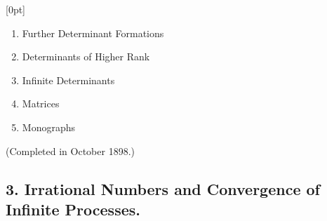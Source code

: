 
\thispagestyle{fancy}

\vspace{0.5cm}


[0pt]
  {}
  {\numberline{}\makebox[1.5cm][l]{\thesubsection}}
  {}
  {\contentspage}

\fontsize{6}{0}\selectfont 
\bfseries 

\begin{enumerate}[itemsep=0pt,start=31]
    \item Further Determinant Formations
    \item Determinants of Higher Rank
    \item Infinite Determinants
    \item Matrices
    \item Monographs
\end{enumerate}

\vspace{-0.1cm}
{\normalfont(Completed in October 1898.)}

\subsection*{\small 3. Irrational Numbers and Convergence of Infinite Processes. \newline {}}

